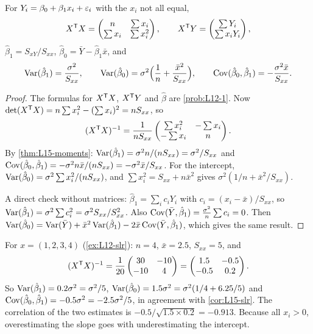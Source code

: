 \begin{corollary}\label{cor:L15-slr}
For $Y_i=\beta_0+\beta_1x_i+\varepsilon_i$ with the $x_i$ not all equal,
\[
X^{\mathsf T} X=\begin{pmatrix}n&\sum x_i\\\sum x_i&\sum x_i^2\end{pmatrix},\qquad X^{\mathsf T} Y=\begin{pmatrix}\sum Y_i\\\sum x_iY_i\end{pmatrix},
\]
$\hat\beta_1=S_{xY}/S_{xx}$, $\hat\beta_0=\bar Y-\hat\beta_1\bar x$, and
\[
\operatorname{Var}(\hat\beta_1)=\frac{\sigma^2}{S_{xx}},\qquad
\operatorname{Var}(\hat\beta_0)=\sigma^2\Bigl(\frac1n+\frac{\bar x^2}{S_{xx}}\Bigr),\qquad
\operatorname{Cov}(\hat\beta_0,\hat\beta_1)=-\frac{\sigma^2\bar x}{S_{xx}} .
\]
\end{corollary}
\begin{proof}
The formulas for $X^{\mathsf T} X$, $X^{\mathsf T} Y$ and $\hat\beta$ are \cref{prob:L12-1}. Now $\det(X^{\mathsf T} X)=n\sum x_i^2-(\sum x_i)^2=nS_{xx}$, so
\[
(X^{\mathsf T} X)^{-1}=\frac1{nS_{xx}}\begin{pmatrix}\sum x_i^2&-\sum x_i\\-\sum x_i&n\end{pmatrix}.
\]
By \cref{thm:L15-moments}: $\operatorname{Var}(\hat\beta_1)=\sigma^2 n/(nS_{xx})=\sigma^2/S_{xx}$ and
$\operatorname{Cov}(\hat\beta_0,\hat\beta_1)=-\sigma^2 n\bar x/(nS_{xx})=-\sigma^2\bar x/S_{xx}$. For the intercept,
$\operatorname{Var}(\hat\beta_0)=\sigma^2\sum x_i^2/(nS_{xx})$, and $\sum x_i^2=S_{xx}+n\bar x^2$ gives
$\sigma^2(1/n+\bar x^2/S_{xx})$.

A direct check without matrices: $\hat\beta_1=\sum_i c_iY_i$ with $c_i=(x_i-\bar x)/S_{xx}$, so
$\operatorname{Var}(\hat\beta_1)=\sigma^2\sum c_i^2=\sigma^2S_{xx}/S_{xx}^2$. Also $\operatorname{Cov}(\bar Y,\hat\beta_1)=\frac{\sigma^2}{n}\sum c_i=0$.
Then $\operatorname{Var}(\hat\beta_0)=\operatorname{Var}(\bar Y)+\bar x^2\operatorname{Var}(\hat\beta_1)-2\bar x\operatorname{Cov}(\bar Y,\hat\beta_1)$, which gives the same result.
\end{proof}

\begin{example}\label{ex:L15-hand}
For $x=(1,2,3,4)$ (\cref{ex:L12-slr}): $n=4$, $\bar x=2.5$, $S_{xx}=5$, and
\[
(X^{\mathsf T} X)^{-1}=\frac1{20}\begin{pmatrix}30&-10\\-10&4\end{pmatrix}=\begin{pmatrix}1.5&-0.5\\-0.5&0.2\end{pmatrix}.
\]
So $\operatorname{Var}(\hat\beta_1)=0.2\sigma^2=\sigma^2/5$, $\operatorname{Var}(\hat\beta_0)=1.5\sigma^2=\sigma^2(1/4+6.25/5)$ and
$\operatorname{Cov}(\hat\beta_0,\hat\beta_1)=-0.5\sigma^2=-2.5\sigma^2/5$, in agreement with \cref{cor:L15-slr}. The
correlation of the two estimates is $-0.5/\sqrt{1.5\times0.2}=-0.913$. Because all $x_i>0$, overestimating the
slope goes with underestimating the intercept.
\end{example}

